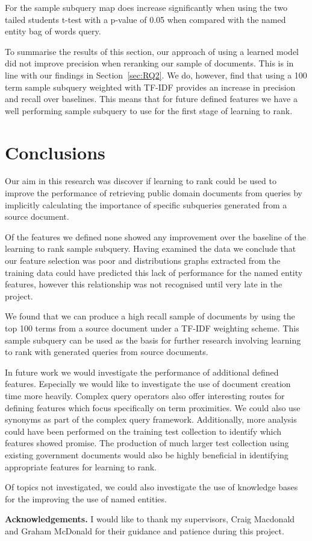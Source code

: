 \documentclass{mpaper}
\begin{document}
For the sample subquery map does increase significantly when using the two tailed students t-test with a p-value of 0.05 when compared with the named entity bag of words query.

To summarise the results of this section, our approach of using a learned model did not improve precision when reranking our sample of documents. This is in line with our findings in Section~\ref{sec:RQ2}. We do, however, find that using a 100 term sample subquery weighted with TF-IDF provides an increase in precision and recall over baselines. This means that for future defined features we have a well performing sample subquery to use for the first stage of learning to rank.

\section{Conclusions} \label{sec:conclusion}
Our aim in this research was discover if learning to rank could be used to improve the performance of retrieving public domain documents from queries by implicitly calculating the importance of specific subqueries generated from a source document.

Of the features we defined none showed any improvement over the baseline of the learning to rank sample subquery. Having examined the data we conclude that our feature selection was poor and distributions graphs extracted from the training data could have predicted this lack of performance for the named entity features, however this relationship was not recognised until very late in the project.

We found that we can produce a high recall sample of documents by using the top 100 terms from a source document under a TF-IDF weighting scheme. This sample subquery can be used as the basis for further research involving learning to rank with generated queries from source documents.

In future work we would investigate the performance of additional defined features. Especially we would like to investigate the use of document creation time more heavily. Complex query operators also offer interesting routes for defining features which focus specifically on term proximities. We could also use synonyms as part of the complex query framework. Additionally, more analysis could have been performed on the training test collection to identify which features showed promise. The production of much larger test collection using existing government documents would also be highly beneficial in identifying appropriate features for learning to rank.

Of topics not investigated, we could also investigate the use of knowledge bases for the improving the use of named entities.

\vskip8pt \noindent
{\bf Acknowledgements.}
I would like to thank my supervisors, Craig Macdonald and Graham McDonald for their guidance and patience during this project.


\end{document}

